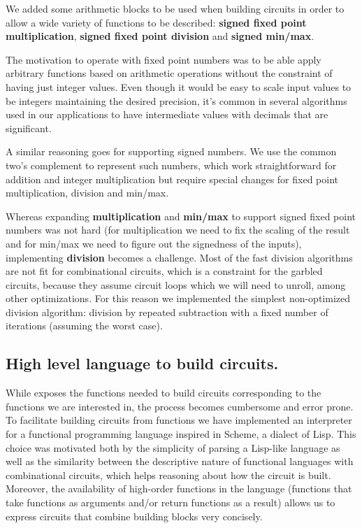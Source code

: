 We added some arithmetic blocks to be used when building circuits in order to
allow a wide variety of functions to be described: \textbf{signed fixed point
multiplication}, \textbf{signed fixed point division} and \textbf{signed
min/max}.

The motivation to operate with fixed point numbers was to be able apply
arbitrary functions based on arithmetic operations without the constraint of
having just integer values.  Even though it would be easy to scale input values
to be integers maintaining the desired precision, it's common in several
algorithms used in our applications to have intermediate values with decimals
that are significant.

A similar reasoning goes for supporting signed numbers.  We use the common
two's complement to represent such numbers, which work straightforward for
addition and integer multiplication but require special changes for fixed point
multiplication, division and min/max.

Whereas expanding \textbf{multiplication} and \textbf{min/max} to support
signed fixed point numbers was not hard (for multiplication we need to fix the
scaling of the result and for min/max we need to figure out the signedness of
the inputs), implementing \textbf{division} becomes a challenge.  Most of the
fast division algorithms are not fit for combinational circuits, which is a
constraint for the garbled circuits, because they assume circuit loops which we
will need to unroll, among other optimizations.  For this reason we implemented
the simplest non-optimized division algorithm: division by repeated subtraction
with a fixed number of iterations (assuming the worst case).

\subsection{High level language to build circuits.}

While \libgarble{} exposes the functions needed to build circuits corresponding
to the functions we are interested in, the process becomes cumbersome and error
prone.  To facilitate building circuits from functions we have implemented an
interpreter for a functional programming language inspired in Scheme, a dialect
of Lisp.  This choice was motivated both by the simplicity of parsing a
Lisp-like language as well as the similarity between the descriptive nature of
functional languages with combinational circuits, which helps reasoning about
how the circuit is built.  Moreover, the availability of high-order functions
in the language (functions that take functions as arguments and/or return
functions as a result) allows us to express circuits that combine building
blocks very concisely.

